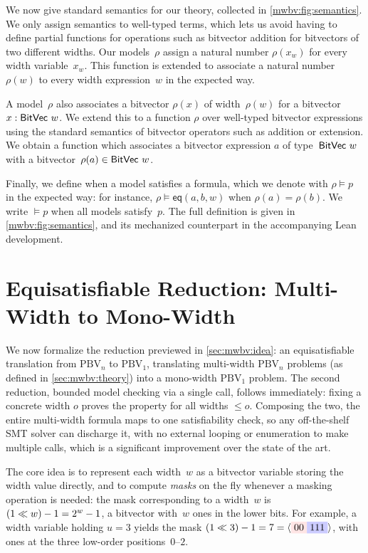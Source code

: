 We now give standard semantics for our theory, collected in
\cref{mwbv:fig:semantics}.
We only assign semantics to well-typed terms,
which lets us avoid having to define
partial functions for operations such as bitvector addition for bitvectors of
two different widths. Our models~$\rho$ assign a natural number $\rho(x_w)$ for
every width variable~$x_w$. This function is extended to associate a natural
number $\rho(w)$ to every width expression~$w$ in the expected way.

A model~$\rho$ also associates a bitvector $\rho(x)$ of width~$\rho(w)$ for a
bitvector $x : \mathsf{BitVec}~{w}$.
%
We extend this to a function $\rho$ over well-typed bitvector expressions using
the standard semantics of bitvector operators such as addition or extension. We
obtain a function which associates a bitvector expression $a$ of type~$\mathsf{BitVec}~{w}$
with a bitvector~$\rho(a) \in \mathsf{BitVec}~{w}$.

Finally, we define when a model satisfies a formula, which we denote with $\rho
\vDash p$ in the expected way: for instance, $\rho \vDash \mathsf{eq}(a, b, w)$ when
$\rho(a) = \rho(b)$.
%
We write $\vDash p$ when all models satisfy~$p$.
The full definition is given in \cref{mwbv:fig:semantics}, and its mechanized
counterpart in the accompanying Lean development.

\section{Equisatisfiable Reduction: Multi-Width to Mono-Width}
\label{sec:mwbv:reduction}

We now formalize the reduction previewed in \cref{sec:mwbv:idea}:
an equisatisfiable translation from $\text{PBV}_n$ to $\text{PBV}_1$,
translating multi-width $\text{PBV}_n$ problems (as defined in \cref{sec:mwbv:theory})
into a mono-width $\text{PBV}_1$ problem.
The second reduction, bounded model checking via a single \qfbv{} call, follows immediately: fixing a concrete width $o$ proves
the property for all widths $\leq o$.
Composing the two, the entire multi-width formula maps to
one \qfbv{} satisfiability check, so any off-the-shelf SMT solver can discharge it,
with no external looping or enumeration to make multiple \qfbv{} calls, which is a significant improvement over the state of the art.

The core idea is to represent each width~$w$ as a bitvector variable storing the
width value directly, and to compute \emph{masks} on the fly whenever a
masking operation is needed:
the mask corresponding to a width~$w$ is $(1 \ll w) - 1 = 2^{w} - 1$, a
bitvector with~$w$ ones in the lower bits.
%
For example, a width variable holding $u = 3$ yields the mask
$(1 \bitshl 3) - 1 = 7 = \langle \redbox{00}\bluebox{111} \rangle$,
with ones at the three low-order positions~$0$--$2$.


